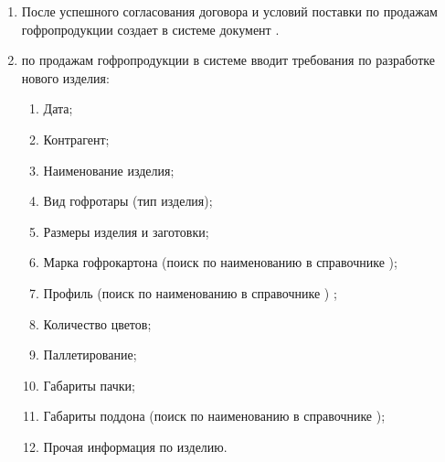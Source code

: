 \begin{enumerate}
\item	После успешного согласования договора и условий поставки \manager по продажам гофропродукции создает в системе \gofro документ .

\item \manager по продажам гофропродукции в системе \gofro вводит требования по разработке нового изделия: 

\begin{enumerate}
     \item 	Дата;
 \item 	Контрагент;
 \item 	Наименование изделия;
 \item 	Вид гофротары (тип изделия);
 \item 	Размеры изделия и  заготовки;
 \item 	Марка гофрокартона (поиск по наименованию в справочнике );
 \item 	Профиль (поиск по наименованию в справочнике ) ;
 \item 	Количество цветов;
 \item 	Паллетирование;
 \item 	Габариты пачки;
 \item 	Габариты поддона (поиск по наименованию в справочнике );
 \item 	Прочая информация по изделию.
 \end{enumerate}



\end{enumerate}

